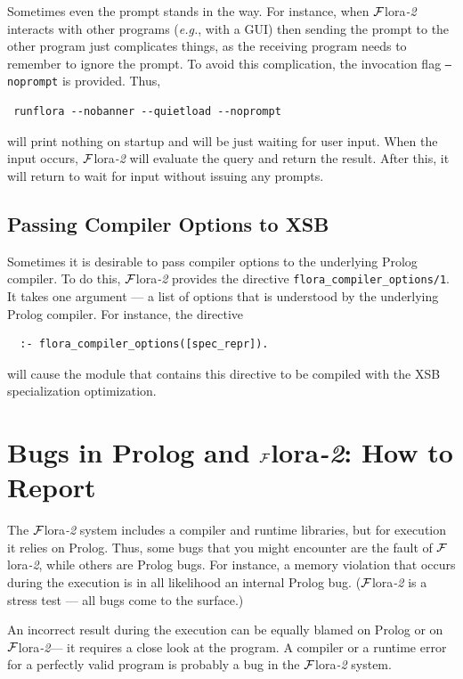 \documentclass[11pt]{article}
\newcommand{\FLORA}{{\mbox{\sc ${\cal F}${lora}\rm\emph{-2}}}\xspace}
\begin{document}
Sometimes even the prompt stands in the way. For instance, when \FLORA
interacts with other programs ({\it e.g.}, with a GUI) then sending the
prompt to the other program just complicates things, as the receiving
program needs to remember to ignore the prompt. To avoid this complication,
the invocation flag {\tt --noprompt} is provided. Thus,
\begin{verbatim}
 runflora --nobanner --quietload --noprompt
\end{verbatim}
will print nothing on startup and will be just waiting for user input. When
the input occurs, \FLORA will evaluate the query and return the result.
After this, it will return to wait for input without issuing any
prompts.

\subsection{Passing Compiler Options to XSB}

Sometimes it is desirable to pass compiler options to the underlying Prolog
compiler. To do this, \FLORA provides the directive
{\tt flora\_compiler\_options/1}. It takes one argument --- a list of
options that is understood by the underlying Prolog compiler. For instance,
the directive
\begin{verbatim}
  :- flora_compiler_options([spec_repr]).  
\end{verbatim}
will cause the module that contains this directive to be compiled with the
XSB specialization optimization.


\section{Bugs in Prolog and \FLORA: How to Report}

The \FLORA system includes a compiler and runtime libraries, but for
execution it relies on Prolog. Thus, some bugs that you might encounter are
the fault of \FLORA, while others are Prolog bugs. For instance, a memory
violation that occurs during the execution is in all likelihood an internal
Prolog bug. (\FLORA is a stress test --- all bugs come to the surface.)

An incorrect result during the execution can be equally blamed on Prolog or
on \FLORA --- it requires a close look at the program. A compiler or
a runtime error for a perfectly valid program is probably a bug in the
\FLORA system.
\end{document}
